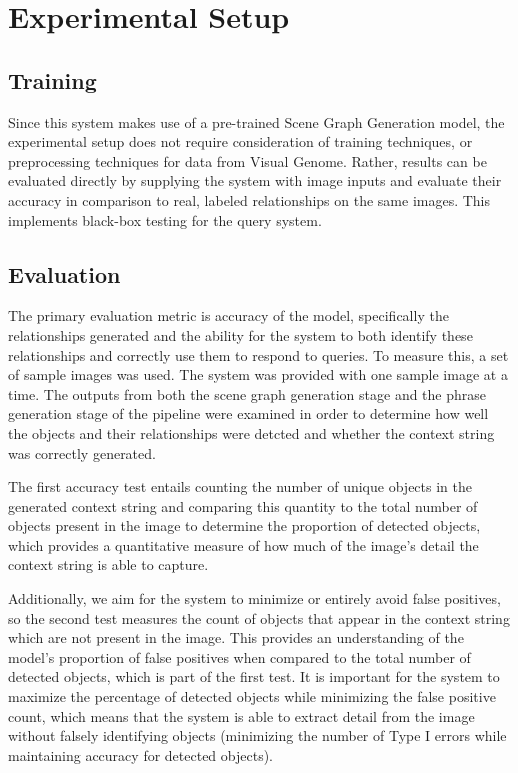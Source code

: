 \documentclass[letterpaper, 10 pt, conference]{ieeeconf}  %
\begin{document}
\section{Experimental Setup}
\subsection*{Training}
    Since this system makes use of a pre-trained Scene Graph Generation model, the experimental setup does not require consideration of training techniques, or preprocessing techniques for data from Visual Genome. Rather, results can be evaluated directly by supplying the system with image inputs and evaluate their accuracy in comparison to real, labeled relationships on the same images. This implements black-box testing for the query system.

\subsection*{Evaluation}

    The primary evaluation metric is accuracy of the model, specifically the relationships generated and the ability for the system to both identify these relationships and correctly use them to respond to queries. To measure this, a set of sample images was used. The system was provided with one sample image at a time. The outputs from both the scene graph generation stage and the phrase generation stage of the pipeline were  examined in order to determine how well the objects and their relationships were detcted and whether the context string was correctly generated. 
    
    The first accuracy test entails counting the number of unique objects in the generated context string and comparing this quantity to the total number of objects present in the image to determine the proportion of detected objects, which provides a quantitative measure of how much of the image's detail the context string is able to capture.
    
    Additionally, we aim for the system to minimize or entirely avoid false positives, so the second test measures the count of objects that appear in the context string which are not present in the image. This provides an understanding of the model's proportion of false positives when compared to the total number of detected objects, which is part of the first test. It is important for the system to maximize the percentage of detected objects while minimizing the false positive count, which means that the system is able to extract detail from the image without falsely identifying objects (minimizing the number of Type I errors while maintaining accuracy for detected objects). 
    
\end{document}
